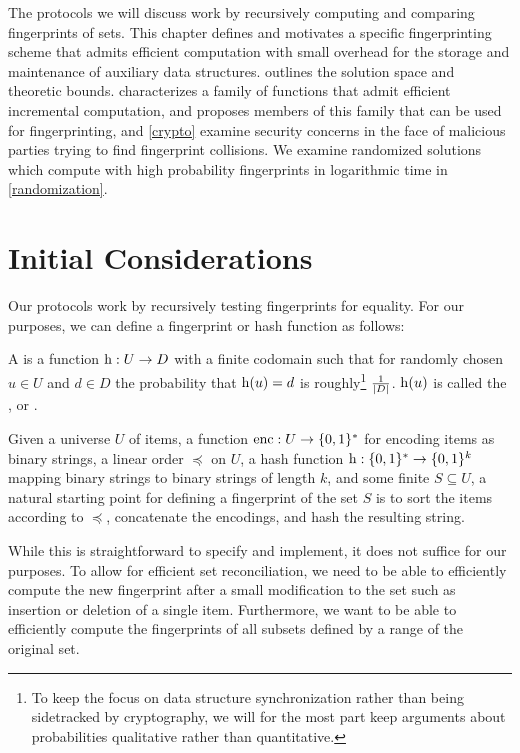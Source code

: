
The protocols we will discuss work by recursively computing and comparing fingerprints of sets.
This chapter defines and motivates a specific fingerprinting scheme that admits efficient computation with small overhead for the storage and maintenance of auxiliary data structures.  outlines the solution space and theoretic bounds.  characterizes a family of functions that admit efficient incremental computation, and  proposes members of this family that can be used for fingerprinting, and \cref{crypto} examine security concerns in the face of malicious parties trying to find fingerprint collisions. We examine randomized solutions which compute with high probability fingerprints in logarithmic time in \cref{randomization}.

\section{Initial Considerations}
\label{initial-considerations}

Our protocols work by recursively testing fingerprints for equality. For our purposes, we can define a fingerprint or hash function as follows:

\begin{definition}
A  is a function ${\operatorname{h}}: {U} \rightarrow {D}$ with a finite codomain such that for randomly chosen $u \in U$ and $d \in D$ the probability that $\operatorname{h}(u) = d$ is roughly\footnote{To keep the focus on data structure synchronization rather than being sidetracked by cryptography, we will for the most part keep arguments about probabilities qualitative rather than quantitative.} $\frac{1}{|{D}|}$. $\operatorname{h}(u)$ is called the ,  or .
\end{definition}

Given a universe $U$ of items, a function $\operatorname{enc} : U \rightarrow \{0, 1\}^{*}$ for encoding items as binary strings, a linear order $\preceq$ on $U$, a hash function $\operatorname{h}: \{0, 1\}^{*} \rightarrow \{0, 1\}^{k}$ mapping binary strings to binary strings of length $k$, and some finite $S \subseteq U$, a natural starting point for defining a fingerprint of the set $S$ is to sort the items according to $\preceq$, concatenate the encodings, and hash the resulting string.

While this is straightforward to specify and implement, it does not suffice for our purposes. To allow for efficient set reconciliation, we need to be able to efficiently compute the new fingerprint after a small modification to the set such as insertion or deletion of a single item. Furthermore, we want to be able to efficiently compute the fingerprints of all subsets defined by a range of the original set.

